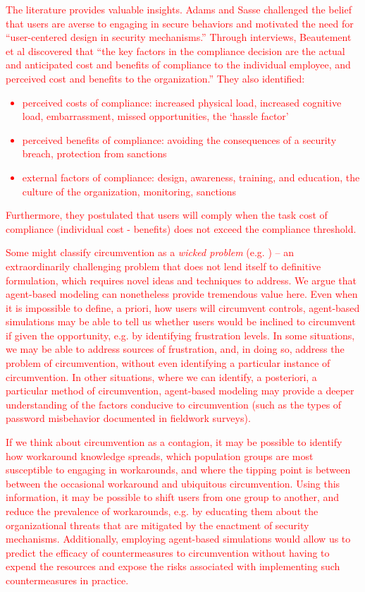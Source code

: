 \documentclass{acm_proc_article-sp}
\begin{document}
\textcolor{red}{The literature provides valuable insights. Adams and Sasse 
\cite{adams1999users} challenged the belief that users 
are averse to engaging in secure behaviors and motivated the need for 
``user-centered design in security mechanisms.'' 
Through interviews, Beautement et al  \cite{beautement2009compliance} discovered that ``the key factors in 
the compliance decision are the actual and anticipated cost and benefits of 
compliance to the individual employee, and perceived cost and benefits to 
the organization.'' They also identified:
\begin{itemize}
\item perceived costs of compliance: increased physical load, increased cognitive load, embarrassment, missed opportunities, the `hassle factor'
\item perceived benefits of compliance: avoiding the consequences of a security breach, protection from sanctions
\item external factors of compliance: design, awareness, training, and education, the culture of the organization, monitoring, sanctions
\end{itemize}
Furthermore, they postulated that users will comply when the task cost of 
compliance (individual cost - benefits) does not exceed the compliance threshold.
}

\textcolor{red}{Some might classify circumvention as a \textit{wicked problem} 
(e.g. \cite{rittel1973dilemmas}) -- 
an extraordinarily challenging problem that does not lend itself to definitive formulation, 
which requires novel ideas and techniques to address. 
We argue that agent-based modeling can nonetheless provide tremendous value here. 
Even when it is impossible to define, a priori, how users will circumvent controls, 
agent-based simulations may be able to tell us whether users would be 
inclined to circumvent if given the opportunity, e.g. by identifying frustration levels.
In some situations, we may be able to address sources of frustration, 
and, in doing so, address the problem of circumvention, without even identifying a 
particular instance of circumvention. In other situations, where we can identify, a posteriori, 
a particular method of circumvention, agent-based modeling may provide a deeper 
understanding of the factors conducive to circumvention 
(such as the types of password misbehavior documented in fieldwork surveys). }

\textcolor{red}{If we think about circumvention as a contagion, it may be possible to identify how workaround
knowledge spreads, which population groups are most susceptible to engaging in workarounds, 
and where the tipping point is between between the occasional workaround and ubiquitous circumvention. 
Using this information, it may be possible to shift users from one group to another, and 
reduce the prevalence of workarounds, e.g. by educating them about the 
organizational threats that are mitigated by the enactment of security mechanisms.
Additionally, employing agent-based simulations would allow us to predict 
the efficacy of countermeasures to circumvention without having to expend the resources 
and expose the risks associated with implementing such countermeasures in practice.}
\end{document}
